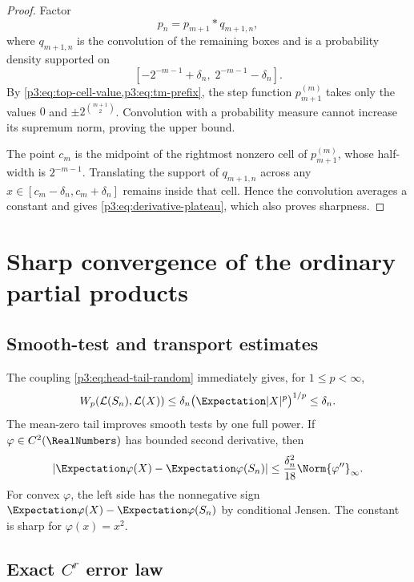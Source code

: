 \documentclass[11pt,oneside]{article}
\numberwithin{equation}{section}
\theoremstyle{definition}
\theoremstyle{remark}
\begin{document}
\begin{proof}
Factor
\[
 p_n=p_{m+1}*q_{m+1,n},
\]
where $q_{m+1,n}$ is the convolution of the remaining boxes and is a probability
density supported on
\[
 \left[-2^{-m-1}+\delta_n,\;2^{-m-1}-\delta_n\right].
\]
By \cref{p3:eq:top-cell-value,p3:eq:tm-prefix}, the step function
$p_{m+1}^{(m)}$ takes only the values
$0$ and $\pm2^{\binom{m+1}{2}}$.  Convolution with a probability measure cannot
increase its supremum norm, proving the upper bound.

The point $c_m$ is the midpoint of the rightmost nonzero cell of
$p_{m+1}^{(m)}$, whose half-width is $2^{-m-1}$.  Translating the support of
$q_{m+1,n}$ across any $x\in[c_m-\delta_n,c_m+\delta_n]$ remains inside that cell.
Hence the convolution averages a constant and gives \cref{p3:eq:derivative-plateau},
which also proves sharpness.
\end{proof}

\section{Sharp convergence of the ordinary partial products}
\label{p3:sec:sharp-convergence}

\subsection{Smooth-test and transport estimates}

The coupling \cref{p3:eq:head-tail-random} immediately gives, for $1\le p<\infty$,
\begin{equation}
 W_p(\mathcal L(S_n),\mathcal L(X))
 \le \delta_n\bigl(\Expectation|X|^p\bigr)^{1/p}\le\delta_n.
 \label{p3:eq:wasserstein-bound}
\end{equation}
The mean-zero tail improves smooth tests by one full power.  If
$\varphi\in C^2(\RealNumbers)$ has bounded second derivative, then
\begin{equation}
 \left|\Expectation\varphi(X)-\Expectation\varphi(S_n)\right|
 \le\frac{\delta_n^2}{18}\Norm{\varphi''}_\infty.
 \label{p3:eq:smooth-test-bound}
\end{equation}
For convex $\varphi$, the left side has the nonnegative sign
$\Expectation\varphi(X)-\Expectation\varphi(S_n)$ by conditional Jensen.  The constant is sharp for
$\varphi(x)=x^2$.

\subsection{Exact $C^r$ error law}
\end{document}
